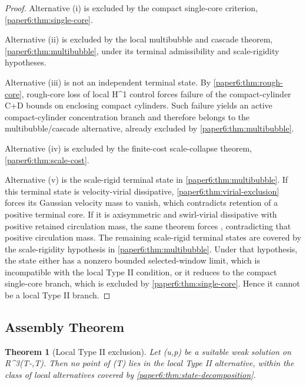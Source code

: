 \documentclass[11pt]{amsart}
\def\({}%
\def\){}%
\def\mathbb#1{#1}%
\theoremstyle{plain}
\newtheorem{theorem}{Theorem}[section]
\theoremstyle{definition}
\theoremstyle{remark}
\begin{document}
\begin{proof}
Alternative \textup{(i)} is excluded by the compact single-core criterion,
\cref{paper6:thm:single-core}.

Alternative \textup{(ii)} is excluded by the local multibubble and cascade
theorem, \cref{paper6:thm:multibubble}, under its terminal admissibility and
scale-rigidity hypotheses.

Alternative \textup{(iii)} is not an independent terminal state.  By
\cref{paper6:thm:rough-core}, rough-core loss of local \(H^1\) control forces
failure of the compact-cylinder \(\mathcal C+\mathcal D\) bounds on enclosing
compact cylinders.  Such failure yields an active compact-cylinder
concentration branch and therefore belongs to the multibubble/cascade
alternative, already excluded by \cref{paper6:thm:multibubble}.

Alternative \textup{(iv)} is excluded by the finite-cost scale-collapse theorem,
\cref{paper6:thm:scale-cost}.

Alternative \textup{(v)} is the scale-rigid terminal state in
\cref{paper6:thm:multibubble}.  If this terminal state is velocity-virial dissipative,
\cref{paper6:thm:virial-exclusion} forces its Gaussian velocity mass to vanish, which
contradicts retention of a positive terminal core.  If it is axisymmetric and
swirl-virial dissipative with positive retained circulation mass, the same
theorem forces \(\Gamma{}\), contradicting that positive circulation mass.
The remaining scale-rigid terminal states are covered by the
scale-rigidity hypothesis in \cref{paper6:thm:multibubble}.  Under that hypothesis, the
state either has a nonzero bounded selected-window limit, which is incompatible
with the local Type II condition, or it reduces to the compact single-core
branch, which is excluded by \cref{paper6:thm:single-core}.  Hence it cannot be a local
Type II branch.
\end{proof}

\subsection{Assembly Theorem}

\begin{theorem}[Local Type II exclusion]
\label{paper6:thm:local-typeII-exclusion}
Let \((u,p)\) be a suitable weak solution on
\(\mathbb R^3\times(T-\delta,T)\).  Then no point of \(\Sigma(T)\) lies in the
local Type II alternative, within the class of local alternatives covered by
\cref{paper6:thm:state-decomposition}.
\end{theorem}
\end{document}
